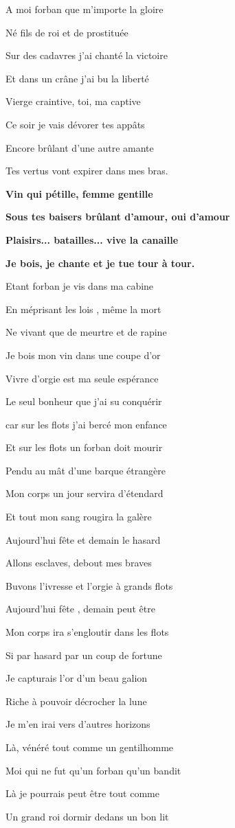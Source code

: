 A moi forban que m'importe la gloire

N\'e fils de roi et de prostitu\'ee

Sur des cadavres j'ai chant\'e la victoire

Et dans un cr\^ane j'ai bu la libert\'e

Vierge craintive, toi, ma captive

Ce soir je vais d\'evorer tes app\^ats

Encore br\^ulant d'une autre amante

Tes vertus vont expirer dans mes bras.

\bigskip

\textbf{Vin qui p\'etille, femme gentille}

\textbf{Sous tes baisers br\^ulant d'amour, oui d'amour}

\textbf{Plaisirs... batailles... vive la canaille}

\textbf{Je bois, je chante et je tue tour \`a tour.}

\bigskip

Etant forban je vis dans ma cabine

En m\'eprisant les lois , m\^eme la mort

Ne vivant que de meurtre et de rapine

Je bois mon vin dans une coupe d'or

Vivre d'orgie est ma seule esp\'erance

Le seul bonheur que j'ai su conqu\'erir

car sur les flots j'ai berc\'e mon enfance

Et sur les flots un forban doit mourir

\bigskip

Pendu au m\^at d'une barque \'etrang\`ere

Mon corps un jour servira d'\'etendard

Et tout mon sang rougira la gal\`ere

Aujourd'hui f\^ete et demain le hasard

Allons esclaves, debout mes braves

Buvons l'ivresse et l'orgie \`a grands flots

Aujourd'hui f\^ete , demain peut \^etre

Mon corps ira s'engloutir dans les flots

\bigskip

Si par hasard par un coup de fortune

Je capturais l'or d'un beau galion

Riche \`a pouvoir d\'ecrocher la lune

Je m'en irai vers d'autres horizons

L\`a, v\'en\'er\'e tout comme un gentilhomme

Moi qui ne fut qu'un forban qu'un bandit

L\`a je pourrais peut \^etre tout comme

Un grand roi dormir dedans un bon lit
